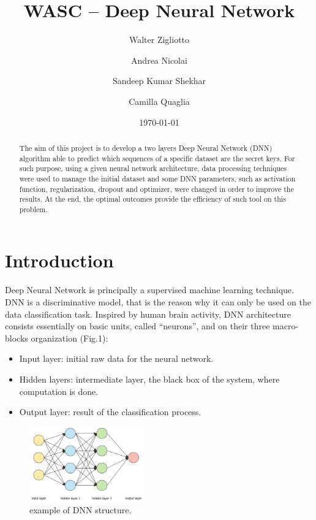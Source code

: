 \documentclass[prl,twocolumn]{revtex4-1}
\begin{document}
\title{WASC -- Deep Neural Network}





\author{Walter Zigliotto}
\author{Andrea Nicolai}
\author{Sandeep Kumar Shekhar}
\author{Camilla Quaglia}

\date{\today}


\begin{abstract}
	
The aim of this project is to develop a two layers Deep Neural Network (DNN) algorithm able to predict which sequences of a specific dataset are the secret keys. For such purpose, using a given neural network architecture, data processing techniques were used to manage the initial dataset and some DNN parameters, such as activation function, regularization, dropout and optimizer, were changed in order to improve the results. At the end, the optimal outcomes provide the efficiency of such tool on this problem.

\end{abstract}

\maketitle


\section{Introduction}

Deep Neural Network is principally a supervised machine learning technique. DNN is a discriminative model, that is the reason why it can only be used on the data classification task. Inspired by human brain activity, DNN architecture consists essentially on basic units, called “neurons”, and on their three macro-blocks organization (Fig.1):
{
\begin{itemize}
	\item Input layer: initial raw data for the neural network.
	\item Hidden layers: intermediate layer, the black box of the system, where computation is done.
	\item Output layer: result of the classification process.
\end{itemize}
}

\begin{figure}[h]
	\includegraphics[width=0.44\textwidth]{DNN_structure.png}
	\caption{example of DNN structure.}
	\label{fig:y}
\end{figure}
\end{document}
